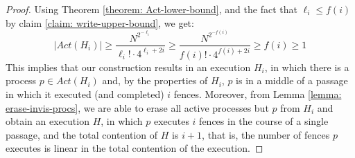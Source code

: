 \begin{proof}
Using Theorem \ref{theorem: Act-lower-bound}, and the fact that $\ell_i \leq f(i)$ by claim \ref{claim: write-upper-bound}, we get:
$$|Act(H_i)| \geq \frac{N^{2^{-\ell_i}}}{\ell_i! \cdot 4^{\ell_i+2i}} \geq
\frac{N^{2^{-f(i)}}}{f(i)! \cdot 4^{f(i)+2i}} \geq f(i) \geq 1
$$
This implies that our construction results in an execution $H_i$, in which there is a process $p \in Act(H_i)$ and, by the properties of $H_i$, $p$ is in a middle of a passage in which it executed (and completed) $i$ fences.
Moreover, from Lemma \ref{lemma: erase-invis-procs}, we are able to erase all active processes but $p$ from $H_i$ and obtain an execution $H$, in which $p$ executes $i$ fences in the course of a single passage, and the total contention of $H$ is $i+1$, that is, the number of fences $p$ executes is linear in the total contention of the execution.
\end{proof}


